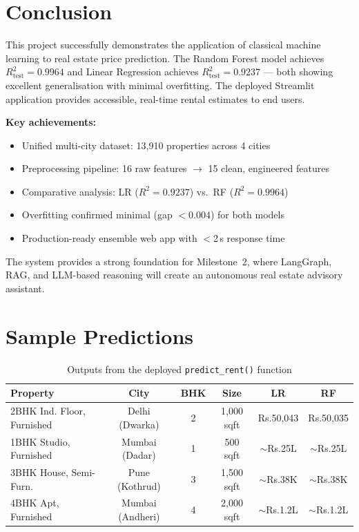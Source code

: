 \documentclass[12pt,a4paper]{article}
\makeatletter
\newcommand{\TH}[1]{\cellcolor{TblHead}\color{white}\sffamily\bfseries\small #1}
\newcommand{\RA}{\cellcolor{RowA}}
\newcommand{\RB}{\cellcolor{RowB}}
\newcommand{\Rs}{Rs.\@}          %
\makeatother
\begin{document}
\section{Conclusion}

This project successfully demonstrates the application of classical machine learning to
real estate price prediction. The Random Forest model achieves $R^{2}_{\text{test}} = 0.9964$
and Linear Regression achieves $R^{2}_{\text{test}} = 0.9237$ --- both showing excellent
generalisation with minimal overfitting. The deployed Streamlit application provides
accessible, real-time rental estimates to end users.

\noindent\textbf{Key achievements:}
\begin{itemize}
  \item Unified multi-city dataset: 13{,}910 properties across 4 cities
  \item Preprocessing pipeline: 16 raw features $\to$ 15 clean, engineered features
  \item Comparative analysis: LR ($R^{2}=0.9237$) vs.\ RF ($R^{2}=0.9964$)
  \item Overfitting confirmed minimal (gap $< 0.004$) for both models
  \item Production-ready ensemble web app with $<$2\,s response time
\end{itemize}

The system provides a strong foundation for Milestone~2, where LangGraph, RAG, and
LLM-based reasoning will create an autonomous real estate advisory assistant.

\appendix
\section{Sample Predictions}

\begin{table}[H]\centering
  \caption{Outputs from the deployed \texttt{predict\_rent()} function}
  \begin{tabularx}{\textwidth}{X c c c c c}
    \toprule
    \TH{Property} & \TH{City} & \TH{BHK} & \TH{Size} & \TH{LR} & \TH{RF} \\
    \midrule
    \RA 2BHK Ind. Floor, Furnished & Delhi (Dwarka)   & 2 & 1{,}000 sqft
        & \Rs50{,}043 & \Rs50{,}035 \\
    \RB 1BHK Studio, Furnished     & Mumbai (Dadar)   & 1 & 500 sqft
        & $\sim$\Rs25L & $\sim$\Rs25L \\
    \RA 3BHK House, Semi-Furn.     & Pune (Kothrud)   & 3 & 1{,}500 sqft
        & $\sim$\Rs38K & $\sim$\Rs38K \\
    \RB 4BHK Apt, Furnished        & Mumbai (Andheri) & 4 & 2{,}000 sqft
        & $\sim$\Rs1.2L & $\sim$\Rs1.2L \\
    \bottomrule
  \end{tabularx}
\end{table}
\end{document}

